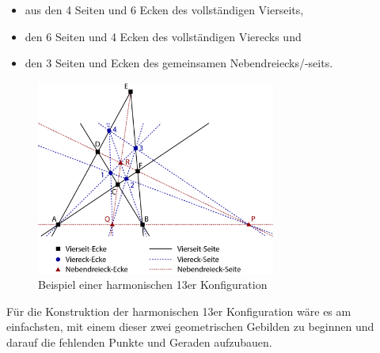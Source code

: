 \documentclass[12pt,a4paper]{article}
\begin{document}
\begin{itemize}
\item[]aus den 4 Seiten und 6 Ecken des vollständigen Vierseits,
\item[]den 6 Seiten und 4 Ecken des vollständigen Vierecks und
\item[]den 3 Seiten und Ecken des gemeinsamen Nebendreiecks/-seits.
\end{itemize}

\begin{figure}[htbp]
\centering
\includegraphics[width=0.7\textwidth]{Bilder/13erKonfigStepbyStep.png}
\caption{Beispiel einer harmonischen 13er Konfiguration}
\label{fig:harmFigur}
\end{figure}

Für die Konstruktion der harmonischen 13er Konfiguration wäre es am einfachsten, mit einem dieser zwei geometrischen Gebilden zu beginnen und darauf die fehlenden Punkte und Geraden aufzubauen.
\end{document}

